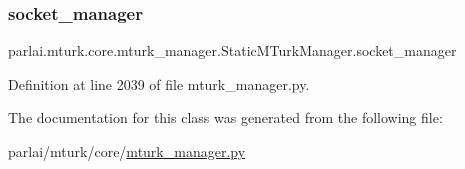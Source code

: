 \subsubsection{\texorpdfstring{socket\+\_\+manager}{socket\_manager}}
{\footnotesize\ttfamily parlai.\+mturk.\+core.\+mturk\+\_\+manager.\+Static\+M\+Turk\+Manager.\+socket\+\_\+manager}



Definition at line 2039 of file mturk\+\_\+manager.\+py.



The documentation for this class was generated from the following file\+:\begin{DoxyCompactItemize}
\item 
parlai/mturk/core/\hyperlink{mturk__manager_8py}{mturk\+\_\+manager.\+py}\end{DoxyCompactItemize}
